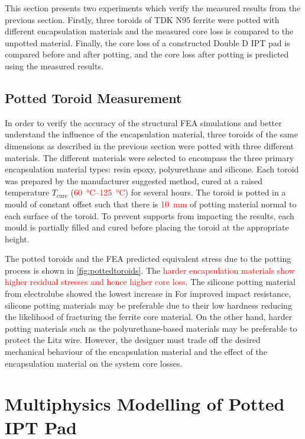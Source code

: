 \documentclass[conference]{IEEEtran}
\begin{document}
This section presents two experiments which verify the measured results from the previous section. 
Firstly, three toroids of TDK N95 ferrite were potted with different encapsulation materials and the measured core loss is compared to the unpotted material. 
Finally, the core loss of a constructed Double D IPT pad is compared before and after potting, and the core loss after potting is predicted using the measured results. 

\subsection{Potted Toroid Measurement}

In order to verify the accuracy of the structural FEA simulations and better understand the influence of the encapsulation material, three toroids of the same dimensions as described in the previous section were potted with three different materials.
The different materials were selected to encompass the three primary encapsulation material types: resin epoxy, polyurethane and silicone. 
Each toroid was prepared by the manufacturer suggested method, cured at a raised temperature $T_\text{cure}$ (\textcolor{red}{\SIrange{60}{125}{\celsius}}) for several hours. 
The toroid is potted in a mould of constant offset such that there is \textcolor{red}{\SI{10}{\milli\meter}} of potting material normal to each surface of the toroid. 
To prevent supports from impacting the results, each mould is partially filled and cured before placing the toroid at the appropriate height. 

The potted toroids and the FEA predicted equivalent stress due to the potting process is shown in \cref{fig:pottedtoroids}.
The \textcolor{red}{harder encapsulation materials show higher residual stresses and hence higher core loss}. 
The silicone potting material from electrolube showed the lowest increase in 
For improved impact resistance, silicone potting materials may be preferable due to their low hardness reducing the likelihood of fracturing the ferrite core material. 
On the other hand, harder potting materials such as the polyurethane-based materials may be preferable to protect the Litz wire. 
However, the designer must trade off the desired mechanical behaviour of the encapsulation material and the effect of the encapsulation material on the system core losses. 

\section{Multiphysics Modelling of Potted IPT Pad}
\label{sec:modelling}
\end{document}

